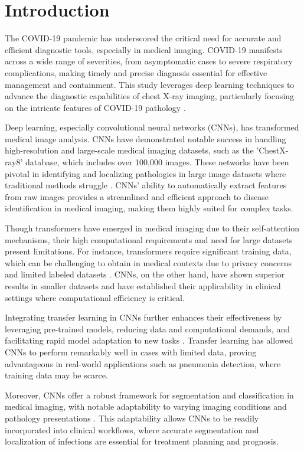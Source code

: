\documentclass[10pt]{article}
\begin{document}
\section{Introduction}
The COVID-19 pandemic has underscored the critical need for accurate and efficient diagnostic tools, especially in medical imaging. COVID-19 manifests across a wide range of severities, from asymptomatic cases to severe respiratory complications, making timely and precise diagnosis essential for effective management and containment. This study leverages deep learning techniques to advance the diagnostic capabilities of chest X-ray imaging, particularly focusing on the intricate features of COVID-19 pathology \cite{Wang2019}.

Deep learning, especially convolutional neural networks (CNNs), has transformed medical image analysis. CNNs have demonstrated notable success in handling high-resolution and large-scale medical imaging datasets, such as the 'ChestX-ray8' database, which includes over 100,000 images. These networks have been pivotal in identifying and localizing pathologies in large image datasets where traditional methods struggle \cite{Wang2019}. CNNs' ability to automatically extract features from raw images provides a streamlined and efficient approach to disease identification in medical imaging, making them highly suited for complex tasks.

Though transformers have emerged in medical imaging due to their self-attention mechanisms, their high computational requirements and need for large datasets present limitations. For instance, transformers require significant training data, which can be challenging to obtain in medical contexts due to privacy concerns and limited labeled datasets \cite{Shamshad2022}. CNNs, on the other hand, have shown superior results in smaller datasets and have established their applicability in clinical settings where computational efficiency is critical.

Integrating transfer learning in CNNs further enhances their effectiveness by leveraging pre-trained models, reducing data and computational demands, and facilitating rapid model adaptation to new tasks \cite{Salehi2023}. Transfer learning has allowed CNNs to perform remarkably well in cases with limited data, proving advantageous in real-world applications such as pneumonia detection, where training data may be scarce.

Moreover, CNNs offer a robust framework for segmentation and classification in medical imaging, with notable adaptability to varying imaging conditions and pathology presentations \cite{Tong2018}. This adaptability allows CNNs to be readily incorporated into clinical workflows, where accurate segmentation and localization of infections are essential for treatment planning and prognosis.
\end{document}
